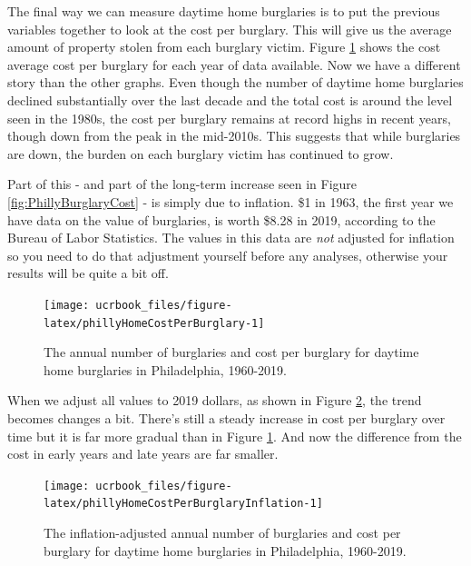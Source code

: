 \documentclass[
  12pt,
  openany]{book}
\begin{document}
The final way we can measure daytime home burglaries is to put the previous variables together to look at the cost per burglary. This will give us the average amount of property stolen from each burglary victim. Figure \ref{fig:phillyHomeCostPerBurglary} shows the cost average cost per burglary for each year of data available. Now we have a different story than the other graphs. Even though the number of daytime home burglaries declined substantially over the last decade and the total cost is around the level seen in the 1980s, the cost per burglary remains at record highs in recent years, though down from the peak in the mid-2010s. This suggests that while burglaries are down, the burden on each burglary victim has continued to grow.

Part of this - and part of the long-term increase seen in Figure \ref{fig:PhillyBurglaryCost} - is simply due to inflation. \$1 in 1963, the first year we have data on the value of burglaries, is worth \$8.28 in 2019, according to the Bureau of Labor Statistics. The values in this data are \emph{not} adjusted for inflation so you need to do that adjustment yourself before any analyses, otherwise your results will be quite a bit off.

\begin{figure}

{\centering \texttt{[image: ucrbook\_files/figure-latex/phillyHomeCostPerBurglary-1]} 

}

\caption{The annual number of burglaries and cost per burglary for daytime home burglaries in Philadelphia, 1960-2019.}\label{fig:phillyHomeCostPerBurglary}
\end{figure}

When we adjust all values to 2019 dollars, as shown in Figure \ref{fig:phillyHomeCostPerBurglaryInflation}, the trend becomes changes a bit. There's still a steady increase in cost per burglary over time but it is far more gradual than in Figure \ref{fig:phillyHomeCostPerBurglary}. And now the difference from the cost in early years and late years are far smaller.

\begin{figure}

{\centering \texttt{[image: ucrbook\_files/figure-latex/phillyHomeCostPerBurglaryInflation-1]} 

}

\caption{The inflation-adjusted annual number of burglaries and cost per burglary for daytime home burglaries in Philadelphia, 1960-2019.}\label{fig:phillyHomeCostPerBurglaryInflation}
\end{figure}
\end{document}
